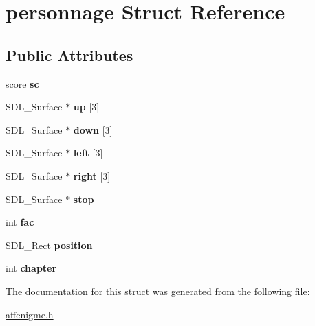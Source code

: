 \hypertarget{structpersonnage}{\section{personnage Struct Reference}
\label{structpersonnage}
}
\subsection*{Public Attributes}
\begin{DoxyCompactItemize}
\item 
\hypertarget{structpersonnage_add01f7c55ea767592d3fae24c99708b4}{\hyperlink{structscore}{score} {\bfseries sc}}\label{structpersonnage_add01f7c55ea767592d3fae24c99708b4}

\item 
\hypertarget{structpersonnage_ad9f6c4826155978e4bc1c2a15e37441a}{S\-D\-L\-\_\-\-Surface $\ast$ {\bfseries up} \mbox{[}3\mbox{]}}\label{structpersonnage_ad9f6c4826155978e4bc1c2a15e37441a}

\item 
\hypertarget{structpersonnage_a3b1dd72c9fa88d06f9d68d3e7293c82c}{S\-D\-L\-\_\-\-Surface $\ast$ {\bfseries down} \mbox{[}3\mbox{]}}\label{structpersonnage_a3b1dd72c9fa88d06f9d68d3e7293c82c}

\item 
\hypertarget{structpersonnage_abe4268f174c2259283c886001d6dcc4e}{S\-D\-L\-\_\-\-Surface $\ast$ {\bfseries left} \mbox{[}3\mbox{]}}\label{structpersonnage_abe4268f174c2259283c886001d6dcc4e}

\item 
\hypertarget{structpersonnage_adcc9d8592f852a1e5a30c2376adacdf0}{S\-D\-L\-\_\-\-Surface $\ast$ {\bfseries right} \mbox{[}3\mbox{]}}\label{structpersonnage_adcc9d8592f852a1e5a30c2376adacdf0}

\item 
\hypertarget{structpersonnage_a5503bce38c44b6f39b26d5ffbbe74ad7}{S\-D\-L\-\_\-\-Surface $\ast$ {\bfseries stop}}\label{structpersonnage_a5503bce38c44b6f39b26d5ffbbe74ad7}

\item 
\hypertarget{structpersonnage_a0450f981ef691d893594ff38ce65a9ec}{int {\bfseries fac}}\label{structpersonnage_a0450f981ef691d893594ff38ce65a9ec}

\item 
\hypertarget{structpersonnage_a61610340e31478c209cbc3fe2d746016}{S\-D\-L\-\_\-\-Rect {\bfseries position}}\label{structpersonnage_a61610340e31478c209cbc3fe2d746016}

\item 
\hypertarget{structpersonnage_accd2a9d7966b5e14d2b33509db76de4a}{int {\bfseries chapter}}\label{structpersonnage_accd2a9d7966b5e14d2b33509db76de4a}

\end{DoxyCompactItemize}


The documentation for this struct was generated from the following file\-:\begin{DoxyCompactItemize}
\item 
\hyperlink{affenigme_8h}{affenigme.\-h}\end{DoxyCompactItemize}
